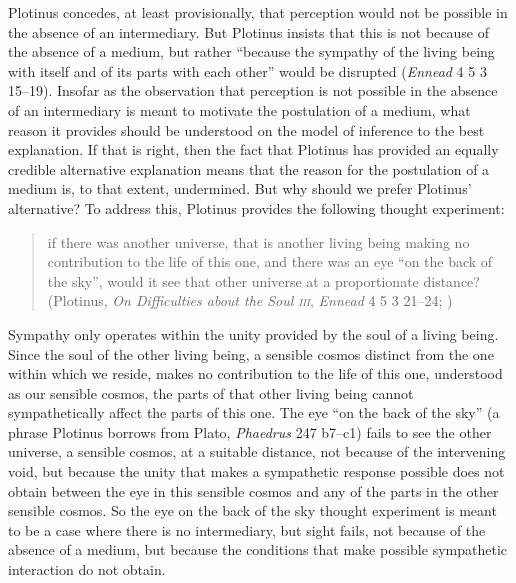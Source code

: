 
Plotinus concedes, at least provisionally, that perception would not be possible in the absence of an intermediary. But Plotinus insists that this is not because of the absence of a medium, but rather ``because the sympathy of the living being with itself and of its parts with each other'' would be disrupted (\emph{Ennead} 4 5 3 15--19). Insofar as the observation that perception is not possible in the absence of an intermediary is meant to motivate the postulation of a medium, what reason it provides should be understood on the model of inference to the best explanation. If that is right, then the fact that Plotinus has provided an equally credible alternative explanation means that the reason for the postulation of a medium is, to that extent, undermined. But why should we prefer Plotinus' alternative? To address this, Plotinus provides the following thought experiment:
\begin{quote}
	if there was another universe, that is another living being making no contribution to the life of this one, and there was an eye ``on the back of the sky'', would it see that other universe at a proportionate distance? (Plotinus, \emph{On Difficulties about the Soul \textsc{iii}}, \emph{Ennead} 4 5 3 21--24; \citealt[293]{Armstrong:1984aa})
\end{quote}
Sympathy only operates within the unity provided by the soul of a living being. Since the soul of the other living being, a sensible cosmos distinct from the one within which we reside, makes no contribution to the life of this one, understood as our sensible cosmos, the parts of that other living being cannot sympathetically affect the parts of this one. The eye ``on the back of the sky'' (a phrase Plotinus borrows from Plato, \emph{Phaedrus} 247 b7--c1) fails to see the other universe, a sensible cosmos, at a suitable distance, not because of the intervening void, but because the unity that makes a sympathetic response possible does not obtain between the eye in this sensible cosmos and any of the parts in the other sensible cosmos. So the eye on the back of the sky thought experiment is meant to be a case where there is no intermediary, but sight fails, not because of the absence of a medium, but because the conditions that make possible sympathetic interaction do not obtain.

